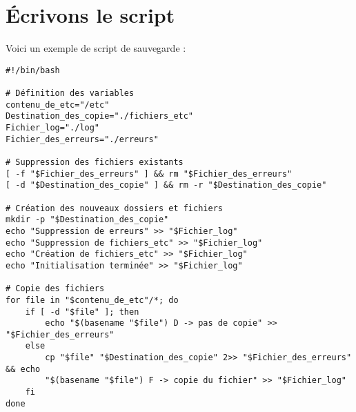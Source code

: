 \documentclass[a4paper,10pt]{article}
\begin{document}
\newpage

\section*{Écrivons le script}

Voici un exemple de script de sauvegarde :

\begin{verbatim}
#!/bin/bash

# Définition des variables
contenu_de_etc="/etc"
Destination_des_copie="./fichiers_etc"
Fichier_log="./log"
Fichier_des_erreurs="./erreurs"

# Suppression des fichiers existants
[ -f "$Fichier_des_erreurs" ] && rm "$Fichier_des_erreurs"
[ -d "$Destination_des_copie" ] && rm -r "$Destination_des_copie"

# Création des nouveaux dossiers et fichiers
mkdir -p "$Destination_des_copie"
echo "Suppression de erreurs" >> "$Fichier_log"
echo "Suppression de fichiers_etc" >> "$Fichier_log"
echo "Création de fichiers_etc" >> "$Fichier_log"
echo "Initialisation terminée" >> "$Fichier_log"

# Copie des fichiers
for file in "$contenu_de_etc"/*; do
    if [ -d "$file" ]; then
        echo "$(basename "$file") D -> pas de copie" >> "$Fichier_des_erreurs"
    else
        cp "$file" "$Destination_des_copie" 2>> "$Fichier_des_erreurs" && echo 
        "$(basename "$file") F -> copie du fichier" >> "$Fichier_log"
    fi
done
\end{verbatim}
\end{document}
